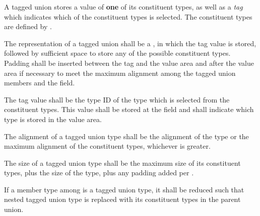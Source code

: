 
\begin{grammar}
 \\
	\terminal{(}  \terminal{)} \\

 \\
	 \terminal{|}  \optional{\terminal{|}}\\
	 \terminal{|}  \\
\end{grammar}

\specsubsubitem
A tagged union stores a value of \textbf{one} of its constituent types, as well
as a \textit{tag} which indicates which of the constituent types is selected.
The constituent types are defined by .

\specsubsubitem
The representation of a tagged union shall be a , in which the
tag value is stored, followed by sufficient space to store any of the possible
constituent types. Padding shall be inserted between the tag and the value area
and after the value area if necessary to meet the maximum alignment among the
tagged union members and the  field.

\specsubsubitem
The tag value shall be the type ID of the type which is selected from the
constituent types. This value shall be stored at the  field and
shall indicate which type is stored in the value area.


\specsubsubitem
The alignment of a tagged union type shall be the alignment of the
 type or the maximum alignment of the constituent types,
whichever is greater.

\specsubsubitem
The size of a tagged union type shall be the maximum size of its constituent
types, plus the size of the  type, plus any padding added per
.

\specsubsubitem
If a member type among  is a tagged union type, it
shall be reduced such that nested tagged union type is replaced with its
constituent types in the parent union.


